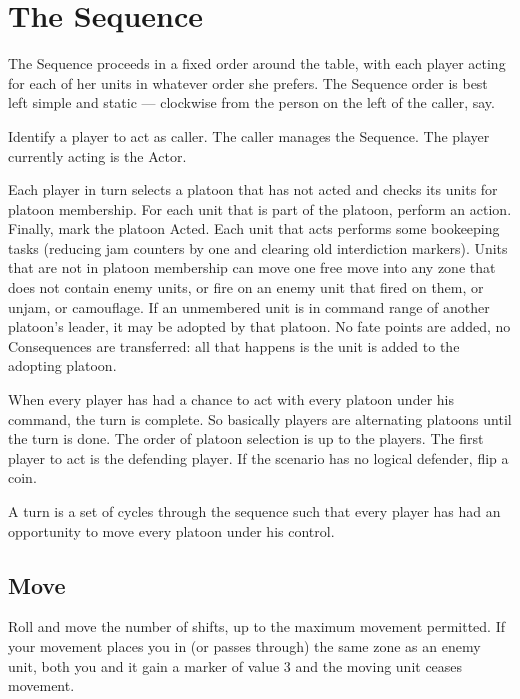 \section{The Sequence}\label{sec:the-sequence}

The Sequence proceeds in a fixed order around the table, with each player acting for each of her units in whatever order she prefers. The Sequence order is best left simple and static --- clockwise from the person on the left of the caller, say.

Identify a player to act as caller. The caller manages the Sequence. The player currently acting is the Actor.

Each player in turn selects a platoon that has not acted and checks its units for platoon membership. For each unit that is part of the platoon, perform an action. Finally, mark the platoon Acted. Each unit that acts performs some bookeeping tasks (reducing jam counters by one and clearing old interdiction markers). Units that are not in platoon membership can move one free move into any zone that does not contain enemy units, or fire on an enemy unit that fired on them, or unjam, or camouflage. If an unmembered unit is in command range of another platoon's leader, it may be adopted by that platoon. No fate points are added, no Consequences are transferred: all that happens is the unit is added to the adopting platoon.

When every player has had a chance to act with every platoon under his command, the turn is complete. So basically players are alternating platoons until the turn is done. The order of platoon selection is up to the players. The first player to act is the defending player. If the scenario has no logical defender, flip a coin.

A turn is a set of cycles through the sequence such that every player has had an opportunity to move every platoon under his control.


\subsection{Move}\label{sec:platoon-combat-move}

Roll  and move the number of shifts, up to the maximum movement permitted. If your movement places you in (or passes through) the same zone as an enemy unit, both you and it gain a \SPOTTED{} marker of value 3 and the moving unit ceases movement.

